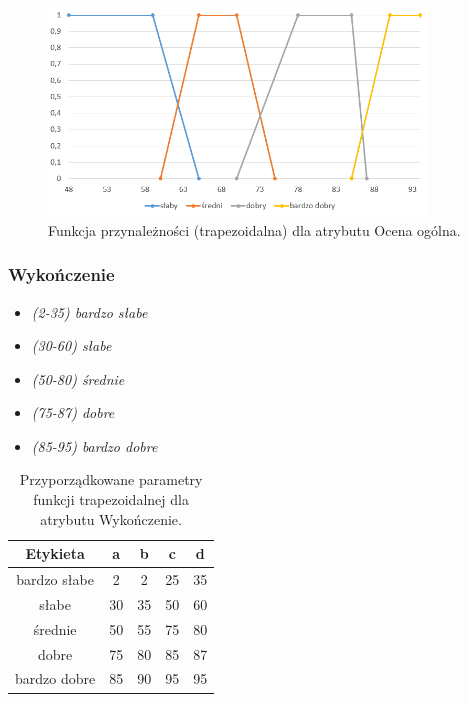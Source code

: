 \documentclass{classrep}
\begin{document}
	\begin{figure}[h!]
		\centering
		\includegraphics[width=0.9\textwidth]{zmienne/4.png}
		\caption{Funkcja przynależności (trapezoidalna) dla atrybutu Ocena ogólna.}
		\label{wykresOverall}
	\end{figure}
	
	
	\newpage
	\subsubsection{Wykończenie}
	\begin{itemize}
		\item \textsl{(2-35) bardzo słabe}
		\item \textsl{(30-60) słabe}
		\item \textsl{(50-80) średnie}
		\item \textsl{(75-87) dobre}
		\item \textsl{(85-95) bardzo dobre}
	\end{itemize}
	
	\begin{table}[h!]
		\centering
		\begin{tabular} {c c c c c}
			\hline
			\textbf{Etykieta} & \textbf{a} & \textbf{b} & \textbf{c} & \textbf{d} \\ [0.5ex] 
			\hline	
			\hline 
			bardzo słabe & 2 & 2 & 25 & 35  \\
			słabe & 30 & 35 & 50 & 60  \\
			średnie & 50 & 55 & 75 & 80  \\
			dobre & 75 & 80 & 85 & 87  \\
			bardzo dobre & 85 & 90 & 95 & 95  \\			
			\hline
		\end{tabular}
		\caption{Przyporządkowane parametry funkcji trapezoidalnej dla atrybutu  Wykończenie. }
		\label{tabelaWykonczenie}
	\end{table}
	
\end{document}
